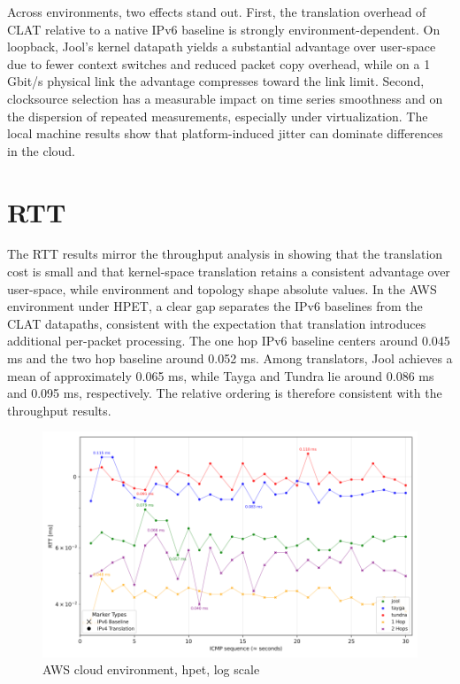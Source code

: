 Across environments, two effects stand out. First, the translation overhead of CLAT relative to a native IPv6 baseline is strongly environment-dependent. On loopback, Jool’s kernel datapath yields a substantial advantage over user-space due to fewer context switches and reduced packet copy overhead, while on a 1 Gbit/s physical link the advantage compresses toward the link limit. Second, clocksource selection has a measurable impact on time series smoothness and on the dispersion of repeated measurements, especially under virtualization. The local machine results show that platform-induced jitter can dominate differences in the cloud.

\section{RTT}
The RTT results mirror the throughput analysis in showing that the translation cost is small and that kernel-space translation retains a consistent advantage over user-space, while environment and topology shape absolute values. In the AWS environment under HPET, a clear gap separates the IPv6 baselines from the CLAT datapaths, consistent with the expectation that translation introduces additional per-packet processing. The one hop IPv6 baseline centers around 0.045 ms and the two hop baseline around 0.052 ms. Among translators, Jool achieves a mean of approximately 0.065 ms, while Tayga and Tundra lie around 0.086 ms and 0.095 ms, respectively. The relative ordering is therefore consistent with the throughput results. 


\begin{figure}[H]
    \centering
    \includegraphics[width=1\textwidth]{resources/plots/CombinedPlot/RTT/AWS_ping_rtt_Ping_30s_log.png}
    \caption{AWS cloud environment, hpet, log scale}
    \label{fig:AWS_icmp_sameScale_hpet_log}

\end{figure}

